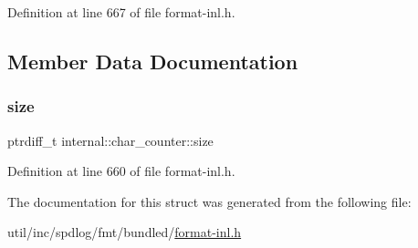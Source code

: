 Definition at line 667 of file format-\/inl.\+h.



\subsection{Member Data Documentation}
\mbox{\label{structinternal_1_1char__counter_ab9382f9bce17c0a397605b9c149d702e}} 
\subsubsection{\texorpdfstring{size}{size}}
{\footnotesize\ttfamily ptrdiff\+\_\+t internal\+::char\+\_\+counter\+::size}



Definition at line 660 of file format-\/inl.\+h.



The documentation for this struct was generated from the following file\+:\begin{DoxyCompactItemize}
\item 
util/inc/spdlog/fmt/bundled/\hyperlink{format-inl_8h}{format-\/inl.\+h}\end{DoxyCompactItemize}

